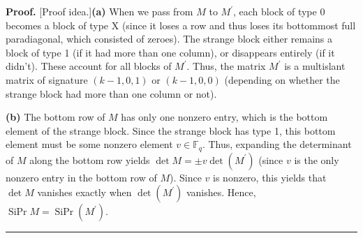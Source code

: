 \documentclass[numbers=enddot,12pt,final,onecolumn,notitlepage]{scrartcl}%
\theoremstyle{definition}
\newenvironment{proof}[1][Proof]{\noindent\textbf{#1.} }{\ \rule{0.5em}{0.5em}}
\newcommand{\Fq}{\mathbb{F}_q}
\theoremstyle{plainsl}
\begin{document}
\begin{proof}
[Proof idea.]\textbf{(a)} When we pass from $M$ to $M^{\prime}$, each block of
type 0 becomes a block of type X (since it loses a row and thus loses its
bottommost full paradiagonal, which consisted of zeroes). The strange block
either remains a block of type 1 (if it had more than one column), or
disappears entirely (if it didn't). These account for all blocks of
$M^{\prime}$. Thus, the matrix $M^{\prime}$ is a multislant matrix of
signature $\left(  k-1,0,1\right)  $ or $\left(  k-1,0,0\right)  $ (depending
on whether the strange block had more than one column or not).

\textbf{(b)} The bottom row of $M$ has only one nonzero entry, which is the
bottom element of the strange block. Since the strange block has type 1, this
bottom element must be some nonzero element $v\in \Fq$. Thus, expanding the
determinant of $M$ along the bottom row yields $\det M=\pm v\det\left(
M^{\prime}\right)  $ (since $v$ is the only nonzero entry in the bottom row of
$M$). Since $v$ is nonzero, this yields that $\det M$ vanishes exactly when
$\det\left(  M^{\prime}\right)  $ vanishes. Hence, $\operatorname*{SiPr}%
M=\operatorname*{SiPr}\left(  M^{\prime}\right)  $.
\end{proof}
\end{document}
